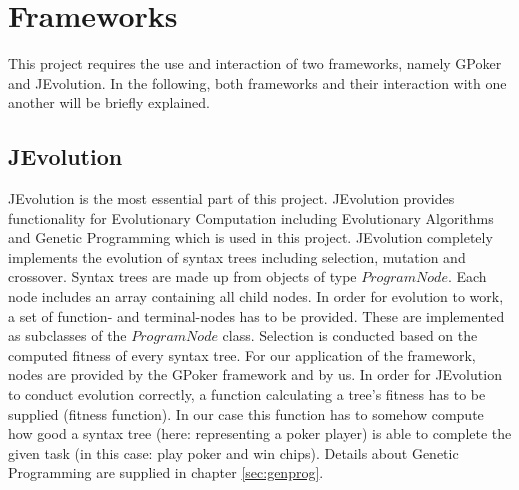 \documentclass[12pt,fleqn,a4paper]{article}
\begin{document}

\newpage

%

\newpage

\section{Frameworks}
This project requires the use and interaction of two frameworks, namely GPoker and JEvolution. In the following, both frameworks and their interaction with one another will be briefly explained.

\subsection{JEvolution}
JEvolution is the most essential part of this project. JEvolution provides functionality for Evolutionary Computation including Evolutionary Algorithms and Genetic Programming which is
used in this project. JEvolution completely implements the evolution of syntax trees including selection, mutation and crossover. Syntax trees are made up from objects of type
$ProgramNode$. Each node includes an array containing all child nodes. In order for evolution to work, a set of function- and terminal-nodes has to be provided. These
are implemented as subclasses of the $ProgramNode$ class. Selection is conducted based on the computed fitness of every syntax tree. For our application of the framework,
nodes are provided by the GPoker framework and by us. In order for JEvolution to conduct evolution correctly, a function calculating a tree's fitness has to be supplied (fitness function). In
our case this function has to somehow compute how good a syntax tree (here: representing a poker player) is able to complete the given task (in this case: play poker and win
chips). Details about Genetic Programming are supplied in chapter \ref{sec:genprog}.
\end{document}
